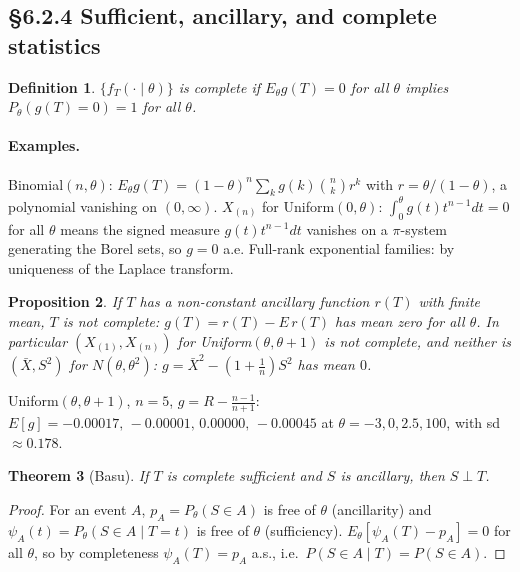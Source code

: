\documentclass[11pt]{article}
\newtheorem{theorem}{Theorem}[section]
\newtheorem{definition}[theorem]{Definition}
\newtheorem{proposition}[theorem]{Proposition}
\begin{document}
\subsection{\S6.2.4 Sufficient, ancillary, and complete statistics}
\begin{definition}
$\{f_T(\cdot\mid\theta)\}$ is \emph{complete} if $E_\theta g(T)=0$ for all $\theta$ implies $P_\theta(g(T)=0)=1$ for all $\theta$.
\end{definition}
\paragraph{Examples.} Binomial$(n,\theta)$: $E_\theta g(T)=(1-\theta)^n\sum_kg(k)\binom nkr^k$ with $r=\theta/(1-\theta)$, a polynomial vanishing on $(0,\infty)$. $X_{(n)}$ for Uniform$(0,\theta)$: $\int_0^\theta g(t)t^{n-1}dt=0$ for all $\theta$ means the signed measure $g(t)t^{n-1}dt$ vanishes on a $\pi$-system generating the Borel sets, so $g=0$ a.e. Full-rank exponential families: by uniqueness of the Laplace transform.
\begin{proposition}
If $T$ has a non-constant ancillary function $r(T)$ with finite mean, $T$ is not complete: $g(T)=r(T)-E\,r(T)$ has mean zero for all $\theta$. In particular $(X_{(1)},X_{(n)})$ for Uniform$(\theta,\theta+1)$ is not complete, and neither is $(\bar X,S^2)$ for $N(\theta,\theta^2)$: $g=\bar X^2-(1+\frac1n)S^2$ has mean $0$.
\end{proposition}
\begin{simbox}
Uniform$(\theta,\theta+1)$, $n=5$, $g=R-\frac{n-1}{n+1}$: $E[g]=-0.00017,\,-0.00001,\,0.00000,\,-0.00045$ at $\theta=-3,0,2.5,100$, with sd $\approx0.178$.
\end{simbox}
\begin{theorem}[Basu]
If $T$ is complete sufficient and $S$ is ancillary, then $S\perp T$.
\end{theorem}
\begin{proof}
For an event $A$, $p_A=P_\theta(S\in A)$ is free of $\theta$ (ancillarity) and $\psi_A(t)=P_\theta(S\in A\mid T=t)$ is free of $\theta$ (sufficiency). $E_\theta[\psi_A(T)-p_A]=0$ for all $\theta$, so by completeness $\psi_A(T)=p_A$ a.s., i.e.\ $P(S\in A\mid T)=P(S\in A)$.
\end{proof}
\end{document}
